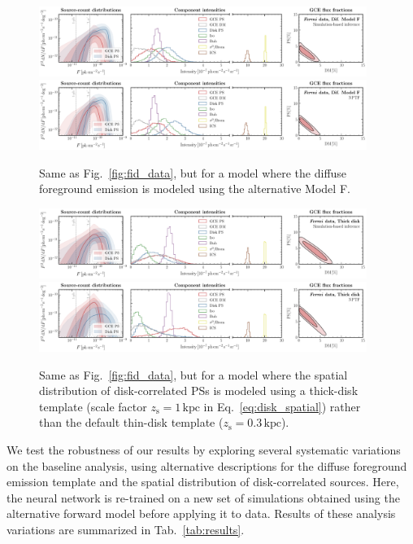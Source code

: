 \documentclass[prd,aps,10pt,nofootinbib,twocolumn,superscriptaddress,preprintnumbers,balancelastpage,longbibliography]{revtex4-1}
\begin{document}
%
\begin{figure}
\centering
\includegraphics[width=0.95\textwidth]{plots/data_fid_sbi_modelF.pdf}
\includegraphics[width=0.95\textwidth]{plots/data_fid_nptf_modelF.pdf}
\caption{Same as Fig.~\ref{fig:fid_data}, but for a model where the diffuse foreground emission is modeled using the alternative Model F.}
\label{fig:fid_data_modelF}
\end{figure}
%

%
\begin{figure}
\centering
\includegraphics[width=0.95\textwidth]{plots/data_fid_sbi_thick.pdf}
\includegraphics[width=0.95\textwidth]{plots/data_fid_nptf_thick.pdf}
\caption{Same as Fig.~\ref{fig:fid_data}, but for a model where the spatial distribution of disk-correlated PSs is modeled using a thick-disk template (scale factor $z_\mathrm{s}=1\,\mathrm{kpc}$ in Eq.~\eqref{eq:disk_spatial}) rather than the default thin-disk template ($z_\mathrm{s}=0.3\,\mathrm{kpc}$).}
\label{fig:fid_data_thick_disk}
\end{figure}
%

We test the robustness of our results by exploring several systematic variations on the baseline analysis, using alternative descriptions for the diffuse foreground emission template and the spatial distribution of disk-correlated sources. Here, the neural network is re-trained on a new set of simulations obtained using the alternative forward model before applying it to \Fermi data. Results of these analysis variations are summarized in Tab.~\ref{tab:results}. \\
\end{document}
